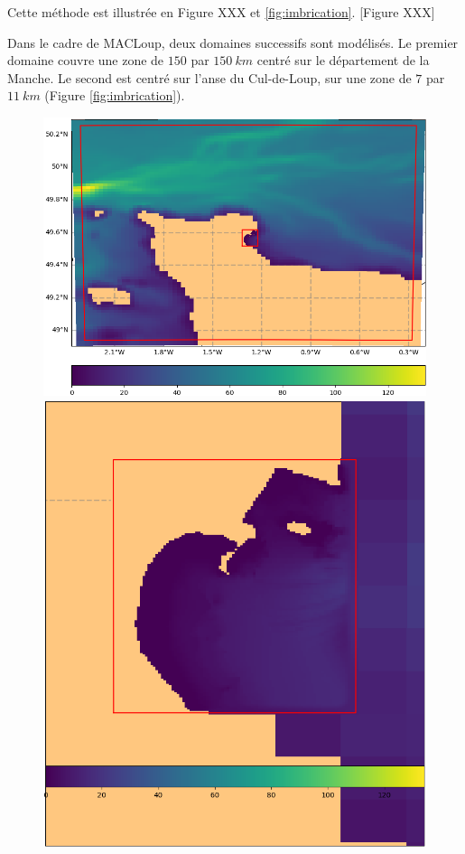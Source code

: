 \documentclass[10pt,a4paper,titlepage]{article}
\begin{document}
    Cette méthode est illustrée en \alert{Figure XXX} et \ref{fig:imbrication}.
    [Figure XXX]
    
    Dans le cadre de MACLoup, deux domaines successifs sont modélisés.
    Le premier domaine couvre une zone de $150$ par $150~km$ centré sur le département de la Manche.
    Le second est centré sur l'anse du Cul-de-Loup, sur une zone de $7$ par $11~km$ (Figure \ref{fig:imbrication}).
    
    
    
    \begin{figure}[h!]
        \centering
        \includegraphics[scale=0.4]{../images/COTENTIN_ADCL5.png}
        \includegraphics[scale=0.27]{../images/ADCL5.png}

\end{figure}
\end{document}
